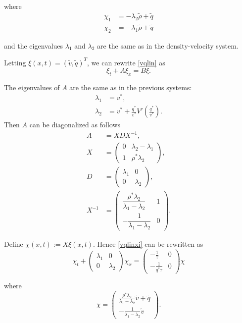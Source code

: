\documentclass[review]{elsarticle}
\begin{document}
where 
\begin{align}
\chi_1 &= -\lambda_2 \tilde{\rho} + \tilde{q} \\
\chi_2 &= -\lambda_1 \tilde{\rho} + \tilde{q}
\end{align}

and the eigenvalues $\lambda_1$ and $\lambda_2$ are the same as in the density-velocity system.

Letting $\xi(x,t) = (\tilde{v}, \tilde{q})^T$, we can rewrite \eqref{vqlin} as
\begin{equation} \label{vqlinxi}
\xi_t + A\xi_x = B\xi.
\end{equation}

The eigenvalues of $A$ are the same as in the previous systems: 
\begin{align}
\lambda_1 &= v^*, \\
\lambda_2 &= v^* + \frac{q^*}{v^*} V'\left(\frac{q^*}{v^*}\right).
\end{align}
Then $A$ can be diagonalized as follows
\begin{align}
A &= XDX^{-1}, \\
X &= \begin{pmatrix}
0 & \lambda_2-\lambda_1 \\
1 & \rho^*\lambda_2
\end{pmatrix}, \\
D &= \begin{pmatrix}
\lambda_1 & 0 \\
0 & \lambda_2
\end{pmatrix},\\
X^{-1} &= \begin{pmatrix}
\dfrac{\rho^*\lambda_2}{\lambda_1 - \lambda_2} & 1 \\
-\dfrac{1}{\lambda_1 - \lambda_2} & 0
\end{pmatrix}.
\end{align}

Define $\chi(x,t) := X\xi(x,t)$. Hence \eqref{vqlinxi} can be rewritten as
\begin{equation} 
\chi_t + \begin{pmatrix}
\lambda_1 & 0 \\
0 & \lambda_2
\end{pmatrix} \chi_x = \begin{pmatrix}
-\frac{1}{\tau} & 0 \\
-\frac{1}{q^* \tau} & 0
\end{pmatrix} \chi
\end{equation}

where 
\begin{equation}
\chi = \begin{pmatrix}
\frac{\rho^*\lambda_2}{\lambda_1 - \lambda_2}\tilde{v} + \tilde{q} \\ 
-\frac{1}{\lambda_1 - \lambda_2}\tilde{v} 
\end{pmatrix}. 
\end{equation}
\end{document}
